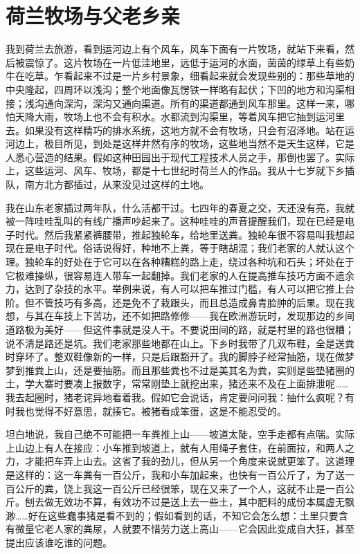 \chapter{荷兰牧场与父老乡亲}

我到荷兰去旅游，看到运河边上有个风车，风车下面有一片牧场，就站下来看，然后被震惊了。这片牧场在一片低洼地里，远低于运河的水面，茵茵的绿草上有些奶牛在吃草。乍看起来不过是一片乡村景象，细看起来就会发现些别的：那些草地的中央隆起，四周环以浅沟；整个地面像瓦愣铁一样略有起伏；下凹的地方和沟渠相接；浅沟通向深沟，深沟又通向渠道。所有的渠道都通到风车那里。这样一来，哪怕天降大雨，牧场上也不会有积水。水都流到沟渠里，等着风车把它抽到运河里去。如果没有这样精巧的排水系统，这地方就不会有牧场，只会有沼泽地。站在运河边上，极目所见，到处是这样井然有序的牧场，这些地当然不是天生这样，它是人悉心营造的结果。假如这种田园出于现代工程技术人员之手，那倒也罢了。实际上，这些运河、风车、牧场，都是十七世纪时荷兰人的作品。我从十七岁就下乡插队，南方北方都插过，从来没见过这样的土地。 

我在山东老家插过两年队，什么活都干过。七四年的春夏之交，天还没有亮，我就被一阵哇哇乱叫的有线广播声吵起来了。这种哇哇的声音提醒我们，现在已经是电子时代。然后我紧紧裤腰带，推起独轮车，给地里送粪。独轮车很不容易叫我想起现在是电子时代。俗话说得好，种地不上粪，等于瞎胡混；我们老家的人就认这个理。独轮车的好处在于它可以在各种糟糕的路上走，绕过各种坑和石头；坏处在于它极难操纵，很容易连人带车一起翻掉。我们老家的人在提高推车技巧方面不遗余力，达到了杂技的水平。举例来说，有人可以把车推过门槛，有人可以把它推上台阶。但不管技巧有多高，还是免不了栽跟头，而且总造成鼻青脸肿的后果。现在我想，与其在车技上下苦功，还不如把路修修——我在欧洲游玩时，发现那边的乡间道路极为美好——但这件事就是没人干。不要说田间的路，就是村里的路也很糟；说不清是路还是坑。我们老家那些地都在山上。下乡时我带了几双布鞋，全是送粪时穿坏了。整双鞋像新的一样，只是后跟豁开了。我的脚脖子经常抽筋，现在做梦梦到推粪上山，还是要抽筋。而且那些粪也不过是美其名为粪，实则是些垫猪圈的土，学大寨时要凑上报数字，常常刚垫上就挖出来，猪还来不及在上面排泄呢……我去起圈时，猪老诧异地看着我。假如它会说话，肯定要问问我：抽什么疯呢？有时我也觉得不好意思，就揍它。被猪看成笨蛋，这是不能忍受的。 

坦白地说，我自己绝不可能把一车粪推上山——坡道太陡，空手走都有点喘。实际上山边上有人在接应：小车推到坡道上，就有人用绳子套住，在前面拉，和两人之力，才能把车弄上山去。这省了我的劲儿，但从另一个角度来说就更笨了。这道理是这样的：这一车粪有一百公斤，我和小车加起来，也快有一百公斤了，为了送一百公斤的粪，饶上我这一百公斤已经很笨，现在又来了一个人，这就不止是一百公斤。刨去做无效功不算，有效功不过是送上去一些土，其中肥料的成份本属虚无飘渺……好在这些蠢事猪是看不到的；假如看到的话，不知它会怎么想：土里只要含有微量它老人家的粪尿，人就要不惜劳力送上高山——它会因此变成自大狂，甚至提出应该谁吃谁的问题。 

